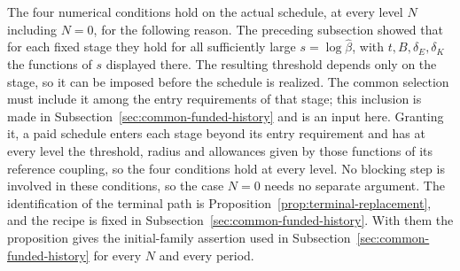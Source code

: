 The four numerical conditions hold on the actual schedule, at every
level $N$ including $N=0$, for the following reason. The preceding
subsection showed that for each fixed stage they hold for all
sufficiently large $s=\log\widehat\beta$, with $t,B,\delta_E,\delta_K$
the functions of $s$ displayed there. The resulting threshold depends
only on the stage, so it can be imposed before the schedule is
realized. The common selection must include it among the entry
requirements of that stage; this inclusion is made in
Subsection~\ref{sec:common-funded-history} and is an input here. Granting
it, a paid schedule enters each stage beyond its entry requirement
and has at every level the threshold, radius and allowances given by
those functions of its reference coupling, so the four conditions
hold at every level. No blocking step is involved in these
conditions, so the case $N=0$ needs no separate argument. The identification of
the terminal path is Proposition~\ref{prop:terminal-replacement}, and
the recipe is fixed in Subsection~\ref{sec:common-funded-history}. With
them the proposition gives the initial-family assertion used in
Subsection~\ref{sec:common-funded-history} for every $N$ and every
period.
